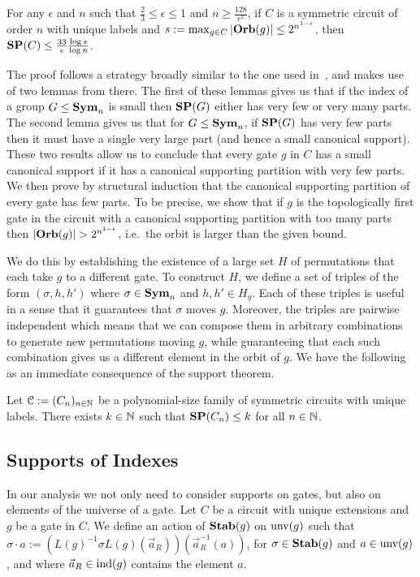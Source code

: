 \documentclass[a4paper,UKenglish]{lipics-v2018}
\begin{document}
\begin{theorem}
  \label{thm:support-thm}
  For any $\epsilon$ and $n$ such that $\frac{2}{3} \leq \epsilon \leq 1$ and $n
  \geq \frac{128}{\epsilon^2}$, if $C$ is a symmetric circuit of order $n$ with
  unique labels and $s := \max_{g \in C} \vert \text{\textbf{Orb}} (g)\vert \leq
  2^{n^{1-\epsilon}}$, then $\text{\textbf{SP}}(C) \leq \frac{33}{\epsilon}\frac{\log s}{\log
    n}$.
\end{theorem}

The proof follows a strategy broadly similar to the one used
in~\cite{AndersonD17}, and makes use of two lemmas from there. The first of
these lemmas gives us that if the index of a group $G \leq \text{\textbf{Sym}}_n$ is small then
$\text{\textbf{SP}}(G)$ either has very few or very many parts. The second lemma gives us that
for $G \leq \text{\textbf{Sym}}_n$, if $\text{\textbf{SP}}(G)$ has very few parts then it must have a single
very large part (and hence a small canonical support). These two results allow
us to conclude that every gate $g$ in $C$ has a small canonical support if it
has a canonical supporting partition with very few parts. We then prove by
structural induction that the canonical supporting partition of every gate has
few parts. To be precise, we show that if $g$ is the topologically first gate in
the circuit with a canonical supporting partition with too many parts then
$\vert \text{\textbf{Orb}}(g) \vert > 2^{n^{1 - \epsilon}}$, i.e.\ the orbit is larger than the
given bound.

We do this by establishing the existence of a large set $H$ of permutations that
each take $g$ to a different gate. To construct $H$, we define a set of triples
of the form $(\sigma, h, h')$ where $\sigma \in \text{\textbf{Sym}}_n$ and $h,h' \in H_g$. Each
of these triples is useful in a sense that it guarantees that $\sigma$ moves
$g$. Moreover, the triples are pairwise independent which means that we can
compose them in arbitrary combinations to generate new permutations moving $g$,
while guaranteeing that each such combination gives us a different element in
the orbit of $g$. We have the following as an immediate consequence of the
support theorem.

\begin{lemma}
  Let $\mathcal{C} := (C_n)_{n \in \mathbb{N}}$ be a polynomial-size family of
  symmetric circuits with unique labels. There exists $k \in \mathbb{N}$ such that
  $\text{\textbf{SP}}(C_n) \leq k$ for all $n \in \mathbb{N}$.
  \label{lem:constant-size-support}
\end{lemma}

\subsection*{Supports of Indexes}
In our analysis we not only need to consider supports on gates, but also on
elements of the universe of a gate. Let $C$ be a circuit with unique extensions
and $g$ be a gate in $C$. We define an action of $\text{\textbf{Stab}}(g)$ on $\text{unv}(g)$
such that $\sigma \cdot a := (L(g)^{-1} \sigma L(g) (\vec{a}_R))
(\vec{a}^{-1}_R(a))$, for $\sigma \in \text{\textbf{Stab}}(g)$ and $a \in \text{unv}(g)$, and
where $\vec{a}_R \in \text{\upshape ind}(g)$ contains the element $a$.
\end{document}
